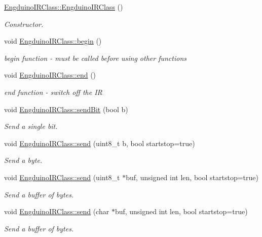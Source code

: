 \begin{DoxyCompactItemize}
\item 
\hyperlink{group___engduino_i_r_ga7a7733226d0614e9d7401d499cccb8de}{Engduino\+I\+R\+Class\+::\+Engduino\+I\+R\+Class} ()
\begin{DoxyCompactList}\small\item\em Constructor. \end{DoxyCompactList}\item 
void \hyperlink{group___engduino_i_r_ga175bacdfa791bca99cf90400559d5a3c}{Engduino\+I\+R\+Class\+::begin} ()
\begin{DoxyCompactList}\small\item\em begin function -\/ must be called before using other functions \end{DoxyCompactList}\item 
void \hyperlink{group___engduino_i_r_ga8ca0afe3a5b7eae3543b5717c95048cc}{Engduino\+I\+R\+Class\+::end} ()
\begin{DoxyCompactList}\small\item\em end function -\/ switch off the I\+R \end{DoxyCompactList}\item 
void \hyperlink{group___engduino_i_r_gaf8b6552647c01a98d12f3acb98f50b8a}{Engduino\+I\+R\+Class\+::send\+Bit} (bool b)
\begin{DoxyCompactList}\small\item\em Send a single bit. \end{DoxyCompactList}\item 
void \hyperlink{group___engduino_i_r_ga5380221a35dec8cae06e305a640047ad}{Engduino\+I\+R\+Class\+::send} (uint8\+\_\+t b, bool startstop=true)
\begin{DoxyCompactList}\small\item\em Send a byte. \end{DoxyCompactList}\item 
void \hyperlink{group___engduino_i_r_gabcf780f269e0570a4dcd1f07f628ba17}{Engduino\+I\+R\+Class\+::send} (uint8\+\_\+t $\ast$buf, unsigned int len, bool startstop=true)
\begin{DoxyCompactList}\small\item\em Send a buffer of bytes. \end{DoxyCompactList}\item 
void \hyperlink{group___engduino_i_r_ga2f933b89a87c5234454509bf6bc53ea5}{Engduino\+I\+R\+Class\+::send} (char $\ast$buf, unsigned int len, bool startstop=true)
\begin{DoxyCompactList}\small\item\em Send a buffer of bytes. \end{DoxyCompactList}\item 

\end{DoxyCompactItemize}
